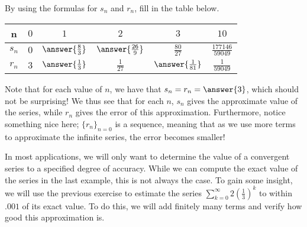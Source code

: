 \documentclass{ximera}
\begin{document}
\begin{example}
By using the formulas for $s_n$ and $r_n$, fill in the table below.  

\begin{center}
\begin{tabular}{c | c | c | c | c | c }
n& $0$ & $1$ & $2$ & $3$ & $10$ \\ [2 ex]
\hline
$s_n$ & $0$ &$ \answer{\frac{8}{3}}$ & $\answer{\frac{26}{9}}$ & $\frac{80}{27}$ & $\frac{177146}{59049}$ \\ [2 ex]
\hline
$r_n$ & $3$ & $\answer{\frac{1}{3}}$ & $\frac{1}{27}$ & $\answer{\frac{1}{81}}$ & $\frac{1}{59049}$
\end{tabular}
\end{center}

Note that for each value of $n$, we have that $s_n = r_n = \answer{3}$, which should not be surprising!  We thus see that for each $n$, $s_n$ gives the approximate value of the series, while $r_n$ gives the error of this approximation.  Furthermore, notice something nice here; $\{r_n\}_{n=0}$ is a  sequence, meaning that as we use more terms to approximate the infinite series, the error becomes smaller! 
\end{example}

In most applications, we will only want to determine the value of a convergent series to a specified degree of accuracy.  While we can compute the exact value of the series in the last example, this is not always the case.  To gain some insight, we will use the previous exercise to estimate the series  $\sum_{k=0}^{\infty} 2\left(\frac{1}{3}\right)^k$ to within $.001$ of its exact value.  To do this, we will add finitely many terms and verify how good this approximation is.
\end{document}
